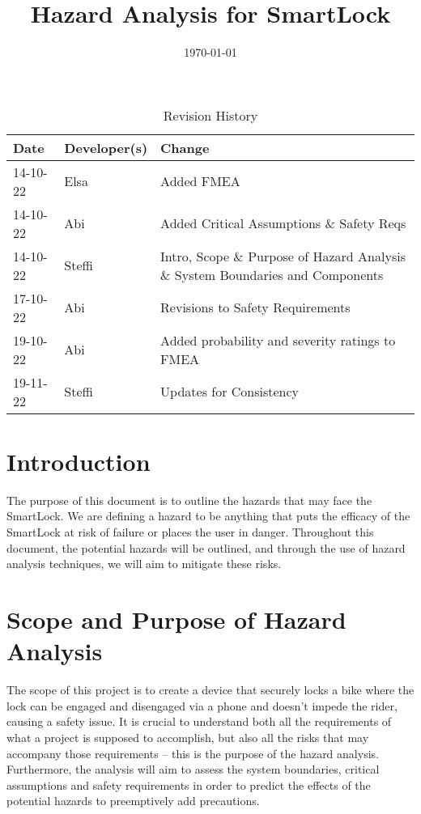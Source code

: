 \documentclass{article}
\title{Hazard Analysis for SmartLock\\\progname}
\author{\authname}
\date{\today}
\begin{document}
\maketitle
\thispagestyle{empty}

\newpage
{}

\begin{table}[hp]
\caption{Revision History} \label{TblRevisionHistory}
\begin{tabularx}{\textwidth}{llX}
\toprule
\textbf{Date} & \textbf{Developer(s)} & \textbf{Change}\\
\midrule
14-10-22 & Elsa & Added FMEA\\
14-10-22 & Abi & Added Critical Assumptions \& Safety Reqs\\
14-10-22 & Steffi & Intro, Scope \& Purpose of Hazard Analysis \& System Boundaries and Components\\
17-10-22 & Abi & Revisions to Safety Requirements\\
19-10-22 & Abi & Added probability and severity ratings to FMEA \\
19-11-22 & Steffi & Updates for Consistency\\
\bottomrule
\end{tabularx}
\end{table}

\newpage


\tableofcontents

\newpage


\section{Introduction}
The purpose of this document is to outline the hazards that may face the SmartLock.  We are defining a hazard to be anything that puts the efficacy of the SmartLock at risk of failure or places the user in danger. 
Throughout this document, the potential hazards will be outlined, and through the use of hazard analysis techniques, we will aim to mitigate these risks. 

\section{Scope and Purpose of Hazard Analysis}

The scope of this project is to create a device that securely locks a bike where the lock can be engaged and disengaged via a phone and doesn’t impede the rider, causing a safety issue.  It is crucial to understand both all the requirements of what a project is supposed to accomplish, but also all the risks that may accompany those requirements – this is the purpose of the hazard analysis.  Furthermore, the analysis will aim to assess the system boundaries, critical assumptions and safety requirements in order to predict the effects of the potential hazards to preemptively add precautions. 
\end{document}
